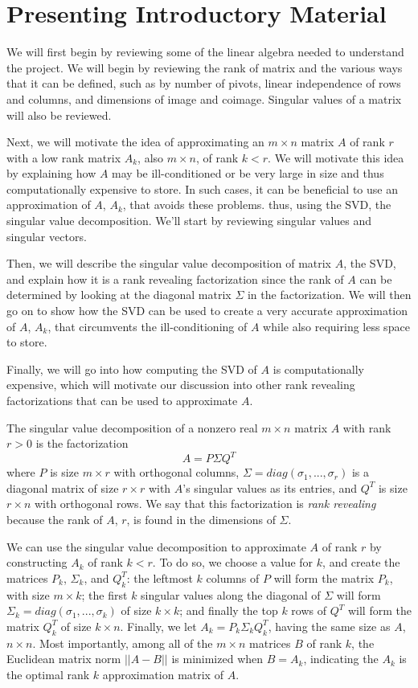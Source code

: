 \section{Presenting Introductory Material}
We will first begin by reviewing some of the linear algebra needed to understand the project. We will begin by reviewing the rank of matrix and the various ways that it can be defined, such as by number of pivots, linear independence of rows and columns, and dimensions of image and coimage. Singular values of a matrix will also be reviewed.

Next, we will motivate the idea of approximating an $m \times n$ matrix $A$ of rank $r$ with a low rank matrix $A_k$, also $m \times n$, of rank $k < r$. We will motivate this idea by explaining how $A$ may be ill-conditioned or be very large in size and thus computationally expensive to store. In such cases, it can be beneficial to use an approximation of $A$, $A_k$, that avoids these problems. thus,  using the SVD, the singular value decomposition. We'll start by reviewing singular values and singular vectors. 

Then, we will describe the singular value decomposition of matrix $A$, the SVD, and explain how it is a rank revealing factorization since the rank of $A$ can be determined by looking at the diagonal matrix $\Sigma$ in the factorization. We will then go on to show how the SVD can be used to create a very accurate approximation of $A$, $A_k$, that circumvents the ill-conditioning of $A$ while also requiring less space to store.

Finally, we will go into how computing the SVD of $A$ is computationally expensive, which will motivate our discussion into other rank revealing factorizations that can be used to approximate $A$.

The singular value decomposition of a nonzero real $m \times n$ matrix $A$ with rank $r > 0$ is the factorization
\[A = P \Sigma Q^{T}\]
where $P$ is size $m \times r$ with orthogonal columns, $\Sigma = diag(\sigma_1, ..., \sigma_r)$ is a diagonal matrix of size $r \times r$ with $A$'s singular values as its entries, and $Q^{T}$ is size $r \times n$ with orthogonal rows.\cite{appliedLinearAlgebra} We say that this factorization is \textit{rank revealing} because the rank of $A$, $r$, is found in the dimensions of $\Sigma$.

We can use the singular value decomposition to approximate $A$ of rank $r$ by constructing $A_k$ of rank $k < r$. To do so, we choose a value for $k$, and create the matrices $P_k$, $\Sigma_k$, and $Q^{T}_{k}$: the leftmost $k$ columns of $P$ will form the matrix $P_k$, with size $m \times k$; the first $k$ singular values along the diagonal of $\Sigma$ will form $\Sigma_k = diag(\sigma_1, ..., \sigma_k)$ of size $k \times k$; and finally the top $k$ rows of $Q^{T}$ will form the matrix $Q^{T}_{k}$ of size $k \times n$. Finally, we let $A_{k} = P_{k}\Sigma_{k}Q^{T}_{k}$, having the same size as $A$, $n \times n$. %
Most importantly, among all of the $m \times n$ matrices $B$ of rank $k$, the Euclidean matrix norm $||A-B||$ is minimized when $B=A_k$, indicating the $A_k$ is the optimal rank $k$ approximation matrix of $A$. \cite{appliedLinearAlgebra}

